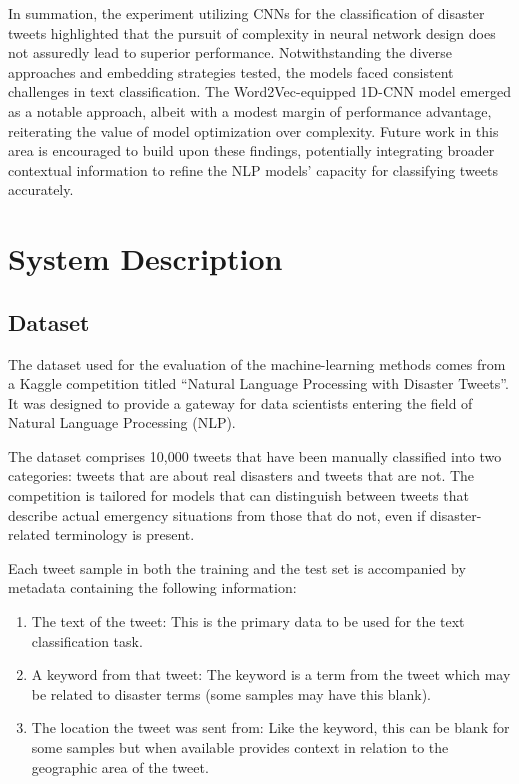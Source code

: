 \documentclass[10pt,table]{article}
\begin{document}
In summation, the experiment utilizing CNNs for the classification of disaster tweets highlighted that the pursuit of complexity in neural network design does not assuredly lead to superior performance. Notwithstanding the diverse approaches and embedding strategies tested, the models faced consistent challenges in text classification. The Word2Vec-equipped 1D-CNN model emerged as a notable approach, albeit with a modest margin of performance advantage, reiterating the value of model optimization over complexity. Future work in this area is encouraged to build upon these findings, potentially integrating broader contextual information to refine the NLP models' capacity for classifying tweets accurately.

\section{System Description}


\subsection{Dataset}
The dataset used for the evaluation of the machine-learning methods comes from a Kaggle competition titled \enquote{Natural Language Processing with Disaster Tweets}. It was designed to provide a gateway for data scientists entering the field of Natural Language Processing (NLP). 

The dataset comprises 10,000 tweets that have been manually classified into two categories: tweets that are about real disasters and tweets that are not. The competition is tailored for models that can distinguish between tweets that describe actual emergency situations from those that do not, even if disaster-related terminology is present. 

Each tweet sample in both the training and the test set is accompanied by metadata containing the following information:

\begin{enumerate}
    \item  The text of the tweet: This is the primary data to be used for the text classification task.
    \item A keyword from that tweet: The keyword is a term from the tweet which may be related to disaster terms (some samples may have this blank).
    \item The location the tweet was sent from: Like the keyword, this can be blank for some samples but when available provides context in relation to the geographic area of the tweet.
\end{enumerate}
\end{document}
